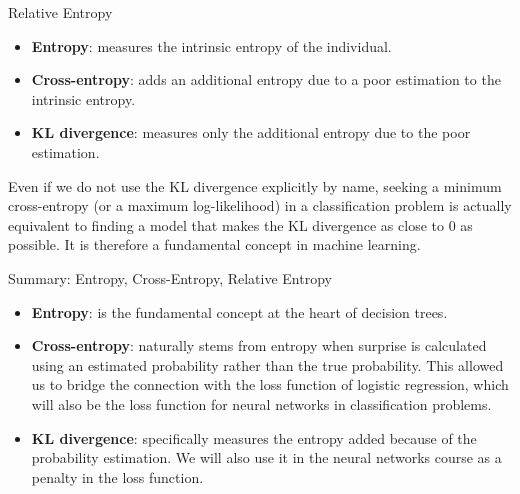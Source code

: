 \begin{frame}{Relative Entropy}
	\begin{itemize}
		\item \textbf{Entropy}: measures the intrinsic entropy of the individual.
		\item \textbf{Cross-entropy}: adds an additional entropy due to a poor estimation to the intrinsic entropy.
		\item \textbf{KL divergence}: measures only the additional entropy due to the poor estimation.
	\end{itemize}
	\pause
	\vspace{0.5cm}
	Even if we do not use the KL divergence explicitly by name, seeking a minimum cross-entropy (or a maximum log-likelihood) in a classification problem is actually equivalent to finding a model that makes the KL divergence as close to 0 as possible. It is therefore a fundamental concept in machine learning.
\end{frame}

\begin{frame}{Summary: Entropy, Cross-Entropy, Relative Entropy}
	\begin{itemize}
		\item \textbf{Entropy}: is the fundamental concept at the heart of decision trees.
		\item \textbf{Cross-entropy}: naturally stems from entropy when surprise is calculated using an estimated probability rather than the true probability. This allowed us to bridge the connection with the loss function of logistic regression, which will also be the loss function for neural networks in classification problems.
		\item \textbf{KL divergence}: specifically measures the entropy added because of the probability estimation. We will also use it in the neural networks course as a penalty in the loss function.
	\end{itemize}
\end{frame}